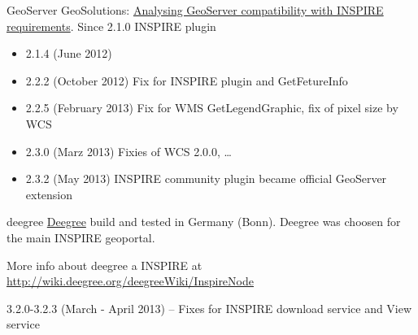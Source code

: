 \documentclass[xcolor=dvipsnames]{beamer}
\begin{document}
\begin{frame}{GeoServer}
    GeoSolutions: \href{http://slideshare.net}{Analysing GeoServer compatibility with INSPIRE requirements}.
Since 2.1.0 INSPIRE plugin
    \begin{itemize}
        \item 2.1.4 (June 2012)
            \pause
        \item 2.2.2 (October 2012) Fix for INSPIRE plugin and GetFetureInfo
            \pause
        \item 2.2.5 (February 2013) Fix for WMS GetLegendGraphic, fix of pixel
            size by WCS
            \pause
        \item 2.3.0 (Marz 2013) Fixies of WCS 2.0.0, \dots
            \pause
        \item 2.3.2 (May 2013) INSPIRE community plugin became official
            GeoServer extension
    \end{itemize}
\end{frame}


\begin{frame}{deegree}
    \href{http://deegree.org}{Deegree} build and tested in Germany (Bonn).
    Deegree was choosen for the main INSPIRE geoportal.

More info about deegree a INSPIRE at
\url{http://wiki.deegree.org/deegreeWiki/InspireNode}

3.2.0-3.2.3 (March - April 2013) -- Fixes for INSPIRE download service and View service
\end{frame}
\end{document}
